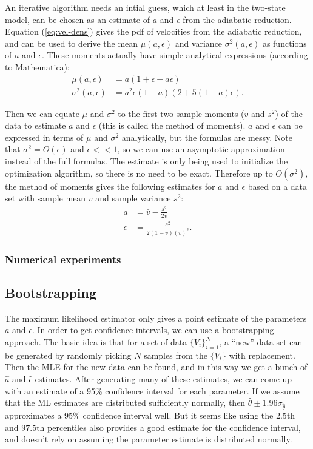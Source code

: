 \documentclass{article}
\begin{document}
An iterative algorithm needs an intial guess, which at least in the
two-state model, can be chosen as an estimate of $a$ and $\epsilon$
from the adiabatic reduction. Equation (\ref{eq:vel-dens}) gives the
pdf of velocities from the adiabatic reduction, and can be used to
derive the mean $\mu(a, \epsilon)$ and variance $\sigma^2(a,
\epsilon)$ as functions of $a$ and $\epsilon$. These moments actually
have simple analytical expressions (according to Mathematica):
\begin{align}
  \label{eq:mean-ar}
  \mu(a, \epsilon) &= a(1 + \epsilon - a \epsilon) \\
  \label{eq:var-ar}
  \sigma^2(a, \epsilon) &= a^2 \epsilon (1 - a) (2 + 5(1 - a) \epsilon).
\end{align}

Then we can equate $\mu$ and $\sigma^2$ to the first two sample
moments ($\bar{v}$ and $s^2$) of the data to estimate $a$ and
$\epsilon$ (this is called the method of moments). $a$ and $\epsilon$
can be expressed in terms of $\mu$ and $\sigma^2$ analytically, but
the formulas are messy. Note that $\sigma^2 = O(\epsilon)$ and
$\epsilon << 1$, so we can use an asymptotic approximation instead of
the full formulas. The estimate is only being used to initialize the
optimization algorithm, so there is no need to be exact. Therefore up
to $O(\sigma^2)$, the method of moments gives the following estimates
for $a$ and $\epsilon$ based on a data set with sample mean $\bar{v}$
and sample variance $s^2$:
\begin{align}
  \label{eq:mean-est}
  a &= \bar{v} - \frac{s^2}{2\bar{v}} \\
  \label{eq:var-est}
  \epsilon &= \frac{s^2}{2(1 - \bar{v})(\bar{v})^2}.
\end{align}

\subsubsection{Numerical experiments}
\label{sec:numer-exper}

\subsection{Bootstrapping}
\label{sec:bootstrapping}

The maximum likelihood estimator only gives a point estimate of the
parameters $a$ and $\epsilon$. In order to get confidence intervals,
we can use a bootstrapping approach. The basic idea is that for a set
of data $\{V_i\}_{i=1}^N$, a ``new'' data set can be generated by
randomly picking $N$ samples from the $\{V_i\}$ with replacement. Then
the MLE for the new data can be found, and in this way we get a bunch
of $\hat{a}$ and $\hat{\epsilon}$ estimates. After generating many of
these estimates, we can come up with an estimate of a 95\% confidence
interval for each parameter. If we assume that the ML estimates are
distributed sufficiently normally, then
$\hat{\theta} \pm 1.96 \sigma_{\hat{\theta}}$ approximates a 95\%
confidence interval well. But it seems like using the $2.5$th and
$97.5$th percentiles also provides a good estimate for the confidence
interval, and doesn't rely on assuming the parameter estimate is
distributed normally.





\end{document}
